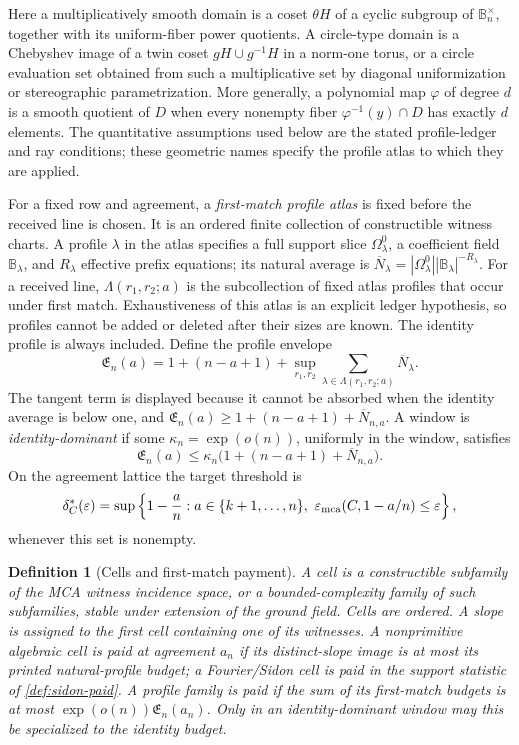 \documentclass[11pt,a4paper]{amsart}
\numberwithin{equation}{section}
\newtheorem{definition}[theorem]{Definition}
\theoremstyle{remark}
\newcommand{\B}{\mathbb B}
\newcommand{\barN}{\overline N}
\newcommand{\Eprof}{\mathfrak E}
\newcommand{\eps}{\varepsilon}
\begin{document}
Here a multiplicatively smooth domain is a coset \(\theta H\) of a
cyclic subgroup of \(\B_n^\times\), together with its uniform-fiber power
quotients.  A circle-type domain is a Chebyshev image of a twin coset
\(gH\cup g^{-1}H\) in a norm-one torus, or a circle evaluation set
obtained from such a multiplicative set by diagonal uniformization or
stereographic parametrization.  More generally, a polynomial map
\(\varphi\) of degree \(d\) is a smooth quotient of \(D\) when every
nonempty fiber \(\varphi^{-1}(y)\cap D\) has exactly \(d\) elements.  The
quantitative assumptions used below are the stated profile-ledger and ray
conditions; these geometric names specify the profile atlas to which they
are applied.

For a fixed row and agreement, a \emph{first-match profile atlas} is fixed
before the received line is chosen.  It is an ordered finite collection of
constructible witness charts.  A profile \(\lambda\) in the atlas specifies
a full support slice
\(\Omega^0_\lambda\), a coefficient field \(\B_\lambda\), and
\(R_\lambda\) effective prefix equations; its natural average is
\(\barN_\lambda=|\Omega^0_\lambda||\B_\lambda|^{-R_\lambda}\).  For a
received line, \(\Lambda(r_1,r_2;a)\) is the subcollection of fixed atlas
profiles that occur under first match.  Exhaustiveness of this atlas is an
explicit ledger hypothesis, so profiles cannot be added or deleted after
their sizes are known.  The identity profile is always included.  Define
the profile envelope
\[
 \Eprof_n(a)=1+(n-a+1)+
 \sup_{r_1,r_2}\sum_{\lambda\in\Lambda(r_1,r_2;a)}\barN_\lambda.
 \tag{1.1}\label{eq:profile-envelope}
\]
The tangent term is displayed because it cannot be absorbed when the
identity average is below one, and
\(\Eprof_n(a)\ge1+(n-a+1)+\barN_{n,a}\).  A window is
\emph{identity-dominant} if some \(\kappa_n=\exp(o(n))\), uniformly in the
window, satisfies
\[
 \Eprof_n(a)\le
 \kappa_n\bigl(1+(n-a+1)+\barN_{n,a}\bigr).
\]
On the agreement lattice the target threshold is
\[
 \delta_C^*(\eps)=\sup\left\{1-\frac an:
 a\in\{k+1,\ldots,n\},\ \eps_{\rm mca}(C,1-a/n)\le\eps\right\},
\]
whenever this set is nonempty.

\begin{definition}[Cells and first-match payment]\label{def:cells}
A \emph{cell} is a constructible subfamily of the MCA witness incidence
space, or a bounded-complexity family of such subfamilies, stable under
extension of the ground field.  Cells are ordered.  A slope is assigned to
the first cell containing one of its witnesses.  A nonprimitive algebraic
cell is \emph{paid} at agreement \(a_n\) if its distinct-slope image is at
most its printed natural-profile budget; a Fourier/Sidon cell is paid in
the support statistic of \cref{def:sidon-paid}.  A profile family is paid
if the sum of its first-match budgets is at most
\(\exp(o(n))\Eprof_n(a_n)\).  Only in an identity-dominant window may this
be specialized to the identity budget.
\end{definition}
\end{document}
